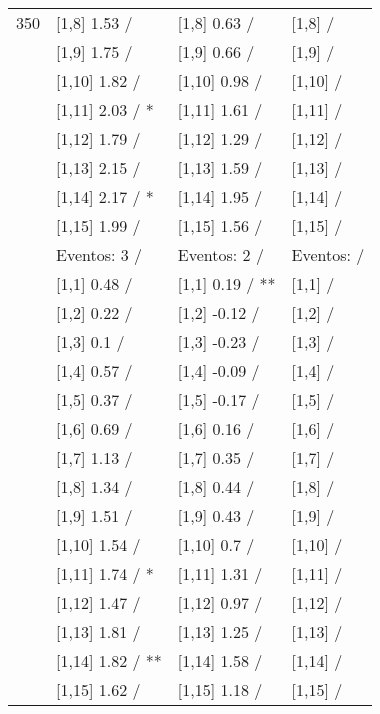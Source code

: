 \begin{table}
\begin{tabular}[t]{llll}
350 & {}[1,8] 1.53  / & {}[1,8] 0.63  / & {}[1,8]  /\\
\addlinespace
 & {}[1,9] 1.75  / & {}[1,9] 0.66  / & {}[1,9]  /\\
 & {}[1,10] 1.82  / & {}[1,10] 0.98  / & {}[1,10]  /\\
 & {}[1,11] 2.03  / * & {}[1,11] 1.61  / & {}[1,11]  /\\
 & {}[1,12] 1.79  / & {}[1,12] 1.29  / & {}[1,12]  /\\
 & {}[1,13] 2.15  / & {}[1,13] 1.59  / & {}[1,13]  /\\
\addlinespace
 & {}[1,14] 2.17  / * & {}[1,14] 1.95  / & {}[1,14]  /\\
 & {}[1,15] 1.99  / & {}[1,15] 1.56  / & {}[1,15]  /\\
 & Eventos:  3 / & Eventos:  2 / & Eventos:   /\\
 & {}[1,1] 0.48  / & {}[1,1] 0.19  / ** & {}[1,1]  /\\
 & {}[1,2] 0.22  / & {}[1,2] -0.12  / & {}[1,2]  /\\
\addlinespace
 & {}[1,3] 0.1  / & {}[1,3] -0.23  / & {}[1,3]  /\\
 & {}[1,4] 0.57  / & {}[1,4] -0.09  / & {}[1,4]  /\\
 & {}[1,5] 0.37  / & {}[1,5] -0.17  / & {}[1,5]  /\\
 & {}[1,6] 0.69  / & {}[1,6] 0.16  / & {}[1,6]  /\\
 & {}[1,7] 1.13  / & {}[1,7] 0.35  / & {}[1,7]  /\\
\addlinespace
500 & {}[1,8] 1.34  / & {}[1,8] 0.44  / & {}[1,8]  /\\
 & {}[1,9] 1.51  / & {}[1,9] 0.43  / & {}[1,9]  /\\
 & {}[1,10] 1.54  / & {}[1,10] 0.7  / & {}[1,10]  /\\
 & {}[1,11] 1.74  / * & {}[1,11] 1.31  / & {}[1,11]  /\\
 & {}[1,12] 1.47  / & {}[1,12] 0.97  / & {}[1,12]  /\\
\addlinespace
 & {}[1,13] 1.81  / & {}[1,13] 1.25  / & {}[1,13]  /\\
 & {}[1,14] 1.82  / ** & {}[1,14] 1.58  / & {}[1,14]  /\\
 & {}[1,15] 1.62  / & {}[1,15] 1.18  / & {}[1,15]  /\\
\bottomrule
\end{tabular}
\end{table}
